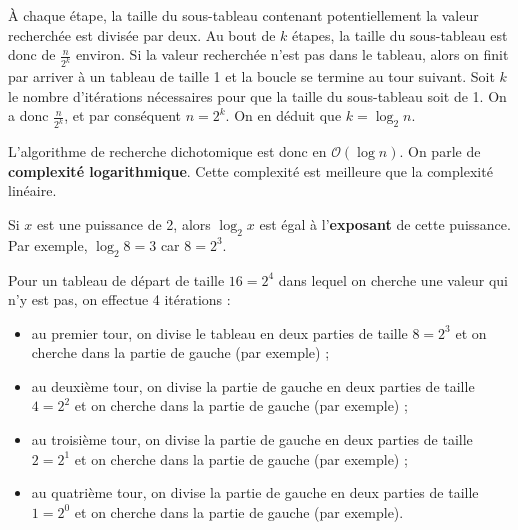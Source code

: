 \documentclass[
  a4paper,
  DIV=11,
  numbers=noendperiod]{scrartcl}
\providecommand{\tightlist}{%
  \setlength{\itemsep}{0pt}\setlength{\parskip}{0pt}}\usepackage{longtable,booktabs,array}
\begin{document}
À chaque étape, la taille du sous-tableau contenant potentiellement la
valeur recherchée est divisée par deux. Au bout de \(k\) étapes, la
taille du sous-tableau est donc de \(\frac{n}{2^k}\) environ. Si la
valeur recherchée n'est pas dans le tableau, alors on finit par arriver
à un tableau de taille 1 et la boucle se termine au tour suivant. Soit
\(k\) le nombre d'itérations nécessaires pour que la taille du
sous-tableau soit de 1. On a donc \(\frac{n}{2^k}\), et par conséquent
\(n=2^k\). On en déduit que \(k=\log_2 n\).

L'algorithme de recherche dichotomique est donc en
\(\mathcal{O}(\log n)\). On parle de \textbf{complexité logarithmique}.
Cette complexité est meilleure que la complexité linéaire.

\begin{tcolorbox}[enhanced jigsaw, bottomrule=.15mm, colback=white, breakable, title=\textcolor{quarto-callout-note-color}{\faInfo}\hspace{0.5em}{Notion de logarithme de base 2}, leftrule=.75mm, opacityback=0, colframe=quarto-callout-note-color-frame, toprule=.15mm, left=2mm, coltitle=black, titlerule=0mm, colbacktitle=quarto-callout-note-color!10!white, rightrule=.15mm, bottomtitle=1mm, opacitybacktitle=0.6, toptitle=1mm, arc=.35mm]

Si \(x\) est une puissance de 2, alors \(\log_2 x\) est égal à
l'\textbf{exposant} de cette puissance. Par exemple, \(\log_2 8 = 3\)
car \(8 = 2^3\).

\end{tcolorbox}

Pour un tableau de départ de taille \(16=2^4\) dans lequel on cherche
une valeur qui n'y est pas, on effectue 4 itérations :

\begin{itemize}
\tightlist
\item
  au premier tour, on divise le tableau en deux parties de taille
  \(8=2^3\) et on cherche dans la partie de gauche (par exemple) ;
\item
  au deuxième tour, on divise la partie de gauche en deux parties de
  taille \(4=2^2\) et on cherche dans la partie de gauche (par exemple)
  ;
\item
  au troisième tour, on divise la partie de gauche en deux parties de
  taille \(2=2^1\) et on cherche dans la partie de gauche (par exemple)
  ;
\item
  au quatrième tour, on divise la partie de gauche en deux parties de
  taille \(1=2^0\) et on cherche dans la partie de gauche (par exemple).
\end{itemize}
\end{document}
